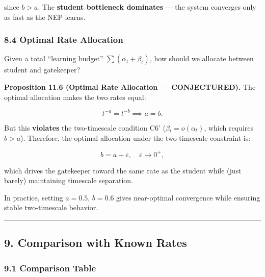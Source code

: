 \documentclass[
  12pt,
]{article}
\begin{document}
since \(b > a\). The \textbf{student bottleneck dominates} --- the
system converges only as fast as the NEP learns.

\subsubsection{8.4 Optimal Rate
Allocation}\label{optimal-rate-allocation}

Given a total ``learning budget'' \(\sum (\alpha_t + \beta_t)\), how
should we allocate between student and gatekeeper?

\textbf{Proposition 11.6 (Optimal Rate Allocation --- CONJECTURED).} The
optimal allocation makes the two rates equal:

\[t^{-a} = t^{-b} \implies a = b.\]

But this \textbf{violates} the two-timescale condition C6'
(\(\beta_t = o(\alpha_t)\), which requires \(b > a\)). Therefore, the
optimal allocation under the two-timescale constraint is:

\[b = a + \varepsilon, \quad \varepsilon \to 0^+,\]

which drives the gatekeeper toward the same rate as the student while
(just barely) maintaining timescale separation.

In practice, setting \(a = 0.5\), \(b = 0.6\) gives near-optimal
convergence while ensuring stable two-timescale behavior.

\begin{center}\rule{0.5\linewidth}{0.5pt}\end{center}

\subsection{9. Comparison with Known
Rates}\label{comparison-with-known-rates}

\subsubsection{9.1 Comparison Table}\label{comparison-table}
\end{document}
